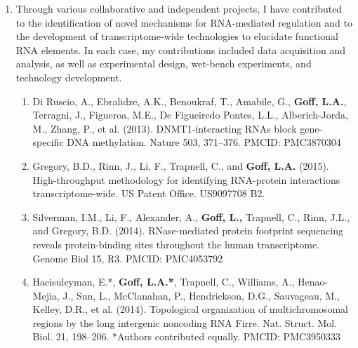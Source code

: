 \documentclass{nihbiosketch}
\begin{document}
\begin{enumerate}
\begin{enumerate}
\end{enumerate}

\item Through various collaborative and independent projects, I have contributed to the identification of novel mechanisms for RNA-mediated regulation and to the development of transcriptome-wide technologies to elucidate functional RNA elements. In each case, my contributions included data acquisition and analysis, as well as experimental design, wet-bench experiments, and technology development.

\begin{enumerate}
\item	Di Ruscio, A., Ebralidze, A.K., Benoukraf, T., Amabile, G., \textbf{Goff, L.A.}, Terragni, J., Figueroa, M.E., De Figueiredo Pontes, L.L., Alberich-Jorda, M., Zhang, P., et al. (2013). DNMT1-interacting RNAs block gene-specific DNA methylation. Nature 503, 371–376. PMCID: PMC3870304

\item	Gregory, B.D., Rinn, J., Li, F., Trapnell, C., and \textbf{Goff, L.A.} (2015). High-throughput methodology for identifying RNA-protein interactions transcriptome-wide. US Patent Office. US9097708 B2.

\item	Silverman, I.M., Li, F., Alexander, A., \textbf{Goff, L.,} Trapnell, C., Rinn, J.L., and Gregory, B.D. (2014). RNase-mediated protein footprint sequencing reveals protein-binding sites throughout the human transcriptome. Genome Biol 15, R3. PMCID: PMC4053792

\item	Hacisuleyman, E.*, \textbf{Goff, L.A.*}, Trapnell, C., Williams, A., Henao-Mejia, J., Sun, L., McClanahan, P., Hendrickson, D.G., Sauvageau, M., Kelley, D.R., et al. (2014). Topological organization of multichromosomal regions by the long intergenic noncoding RNA Firre. Nat. Struct. Mol. Biol. 21, 198–206. *Authors contributed equally. PMCID: PMC3950333

\end{enumerate}


\end{enumerate}
\end{document}
